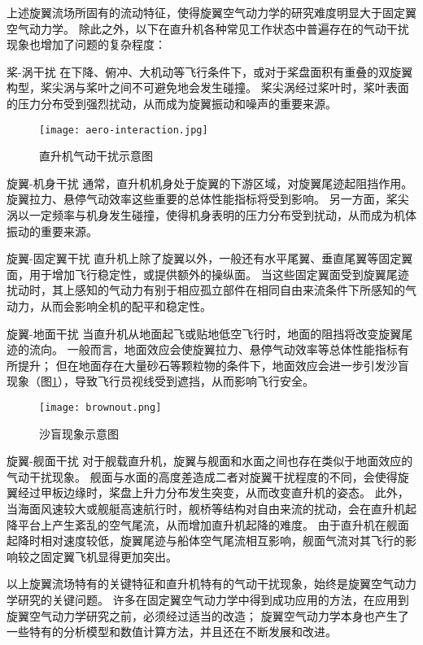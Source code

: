 上述旋翼流场所固有的流动特征，使得旋翼空气动力学的研究难度明显大于固定翼空气动力学。
除此之外，以下在直升机各种常见工作状态中普遍存在的气动干扰现象也增加了问题的复杂程度：
\begin{compactdesc}
  \item[桨-涡干扰]
  在下降、俯冲、大机动等飞行条件下，或对于桨盘面积有重叠的双旋翼构型，桨尖涡与桨叶之间不可避免地会发生碰撞。
  桨尖涡经过桨叶时，桨叶表面的压力分布受到强烈扰动，从而成为旋翼振动和噪声的重要来源。
\begin{figure}[t!]
    \centering
    \texttt{[image: aero-interaction.jpg]}
    \caption{直升机气动干扰示意图}
\end{figure}
  \item[旋翼-机身干扰]
  通常，直升机机身处于旋翼的下游区域，对旋翼尾迹起阻挡作用。
  旋翼拉力、悬停气动效率这些重要的总体性能指标将受到影响。
  另一方面，桨尖涡以一定频率与机身发生碰撞，使得机身表明的压力分布受到扰动，从而成为机体振动的重要来源。
  \item[旋翼-固定翼干扰]
  直升机上除了旋翼以外，一般还有水平尾翼、垂直尾翼等固定翼面，用于增加飞行稳定性，或提供额外的操纵面。
  当这些固定翼面受到旋翼尾迹扰动时，其上感知的气动力有别于相应孤立部件在相同自由来流条件下所感知的气动力，从而会影响全机的配平和稳定性。
  \item[旋翼-地面干扰]
  当直升机从地面起飞或贴地低空飞行时，地面的阻挡将改变旋翼尾迹的流向。
一般而言，地面效应会使旋翼拉力、悬停气动效率等总体性能指标有所提升；
  但在地面存在大量砂石等颗粒物的条件下，地面效应会进一步引发沙盲现象（图\ref{brownout}），导致飞行员视线受到遮挡，从而影响飞行安全。
\begin{figure}[t!]
    \centering
    \texttt{[image: brownout.png]}
    \caption{沙盲现象示意图}\label{brownout}
\end{figure}
  \item[旋翼-舰面干扰]
  对于舰载直升机，旋翼与舰面和水面之间也存在类似于地面效应的气动干扰现象。
  舰面与水面的高度差造成二者对旋翼干扰程度的不同，会使得旋翼经过甲板边缘时，桨盘上升力分布发生突变，从而改变直升机的姿态。  
  此外，当海面风速较大或舰艇高速航行时，舰桥等结构对自由来流的扰动，会在直升机起降平台上产生紊乱的空气尾流，从而增加直升机起降的难度。
  由于直升机在舰面起降时相对速度较低，旋翼尾迹与船体空气尾流相互影响，舰面气流对其飞行的影响较之固定翼飞机显得更加突出。
\end{compactdesc}

以上旋翼流场特有的关键特征和直升机特有的气动干扰现象，始终是旋翼空气动力学研究的关键问题。
许多在固定翼空气动力学中得到成功应用的方法，在应用到旋翼空气动力学研究之前，必须经过适当的改造；
旋翼空气动力学本身也产生了一些特有的分析模型和数值计算方法，并且还在不断发展和改进。

